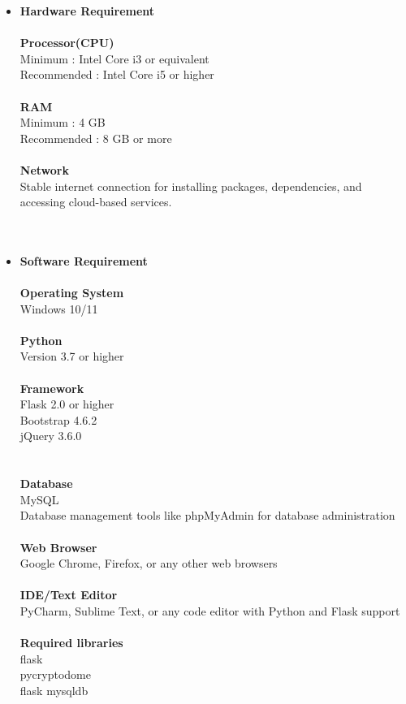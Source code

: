 \documentclass[12pt]{article}
\begin{document}
\begin{itemize}
	\item \textbf{Hardware Requirement}  \\\\
	\textbf{Processor(CPU)}\\
		Minimum : Intel Core i3 or equivalent\\
		Recommended : Intel Core i5 or higher\\\\
	\textbf{RAM}\\
		Minimum : 4 GB\\
		Recommended : 8 GB or more\\\\
	\textbf{Network}\\
		Stable internet connection for installing packages, dependencies, and accessing cloud-based services.\\\\\\
	
	\item \textbf{Software Requirement}\\\\
		\textbf{Operating System}\\
		Windows 10/11\\\\
		\textbf{Python}\\
			Version 3.7 or higher\\\\
     	\textbf{Framework}\\
		Flask 2.0 or higher \\
		Bootstrap 4.6.2\\
		jQuery 3.6.0\\
	\\\\
	\textbf{Database}\\
	MySQL\\
	Database management tools like phpMyAdmin for database administration\\\\
	\textbf{Web Browser}\\
		Google Chrome, Firefox, or any other web browsers \\\\
	\textbf{IDE/Text Editor}\\
	PyCharm, Sublime Text, or any code editor with Python and Flask support \\\\
	\textbf{Required libraries }\\
	flask\\
	pycryptodome \\
	flask mysqldb \\\\	

	   
\end{itemize}
\end{document}
